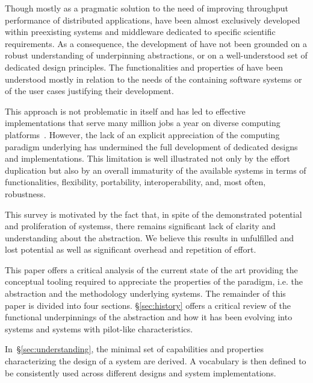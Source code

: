 \documentclass{sig-alternate}
\begin{document}

Though mostly as a pragmatic solution to the need of improving throughput
performance of distributed applications, \pilotjobs have been almost exclusively
developed within preexisting systems and middleware dedicated to specific
scientific requirements. As a consequence, the development of \pilotjobs have
not been grounded on a robust understanding of underpinning abstractions, or on
a well-understood set of dedicated design principles. The functionalities and
properties of \pilotjobs have been understood mostly in relation to the needs of
the containing software systems or of the user cases justifying their
development.

This approach is not problematic in itself and has led to effective
implementations that serve many million jobs a year on diverse computing
platforms~\cite{pj_stats}. However, the lack of an explicit appreciation of the
computing paradigm underlying \pilotjobs has undermined the full development of
dedicated designs and implementations. This limitation is well illustrated not
only by the effort duplication but also by an overall immaturity of the
available systems in terms of functionalities, flexibility, portability,
interoperability, and, most often, robustness.

This survey is motivated by the fact that, in spite of the demonstrated
potential and proliferation of \pilotjob systemss, there remains significant
lack of clarity and understanding about the \pilotjob abstraction. We believe
this results in unfulfilled and lost potential as well as significant overhead
and repetition of effort.

This paper offers a critical analysis of the current state of the art providing
the conceptual tooling required to appreciate the properties of the \pilot
paradigm, i.e. the abstraction and the methodology underlying \pilotjobs
systems. The remainder of this paper is divided into four sections.
\S\ref{sec:history} offers a critical review of the functional underpinnings of
the \pilot abstraction and how it has been evolving into \pilotjob systems and
systems with pilot-like characteristics.

In~\S\ref{sec:understanding}, the minimal set of capabilities and properties
characterizing the design of a \pilotjob system are derived. A vocabulary is
then defined to be consistently used across different designs and
\pilot system implementations.
\end{document}

